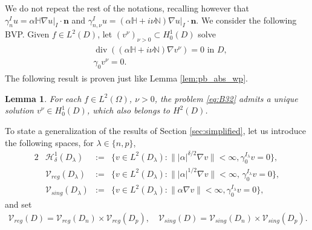 \documentclass[report]{elsarticle}
\newtheorem{lemma}[theorem]{Lemma}
\numberwithin{theorem}{section}
\renewcommand{\vec}[1]{\mathbf{#1}}
\begin{document}
We do not repeat the rest of the notations, recalling however that $\gamma_{n}^{I}u=\left.\alpha \mathbb{H}\nabla u\right|_{I}\cdot \vec{n}$ and $\gamma_{n,\nu}^{I}u=\left.(\alpha \mathbb{H}+i\nu \mathbb{N})\nabla u\right|_{I}\cdot \vec{n}.$
We consider the following BVP. Given $f\in L^2(D)$, let $(v ^{\nu})_{\nu>0}\subset  H^1_0(D)$ solve
\begin{align}
	\label{eq:B32}
	\begin{split}
		&\operatorname{div}((\alpha\mathbb{H}+i\nu\mathbb{N})\nabla v^{\nu})=0 \text { in }D,\\
		&\gamma_0 v^{\nu}=0.
	\end{split}
\end{align}
The following result is proven just like Lemma \ref{lem:pb_abs_wp}. 
\begin{lemma}
	\label{lem:pb_abs_wp_general}
	For each $f\in L^2(\Omega)$, $\nu>0$, the problem \eqref{eq:B32} admits a unique solution $v^{\nu}\in {H}^1_0(D)$, which also belongs to $H^2(D)$. %
\end{lemma}
To state a generalization of the results of Section \ref{sec:simplified}, let us introduce the following spaces, for $\lambda\in \{n,p\}$,
\begin{alignat*}{2}
	&\mathcal{H}^1_{\delta}(D_{\lambda})&:=&\{v\in L^2(D_{\lambda}): \||\alpha|^{\delta/2}\nabla v\|<\infty, \gamma_0^{I_{\lambda}} v=0\},\\
	&\mathcal{V}_{reg}(D_{\lambda})&:=&\{v\in L^2(D_{\lambda}): \||\alpha|^{1/2}\nabla v\|<\infty, \, \gamma_0^{I_{\lambda}} v=0\}, \\ &\mathcal{V}_{sing}(D_{\lambda})&:=&\{v\in L^2(D_{\lambda}): \|\alpha\nabla v\|<\infty, \gamma_0^{I_{\lambda}} v=0\},
\end{alignat*}	
and set
\begin{align*}
	\mathcal{V}_{reg}(D)=\mathcal{V}_{reg}(D_{n})\times \mathcal{V}_{reg}(D_p), \quad \mathcal{V}_{sing}(D)=\mathcal{V}_{sing}(D_{n})\times \mathcal{V}_{sing}(D_p).
\end{align*}	
\end{document}
